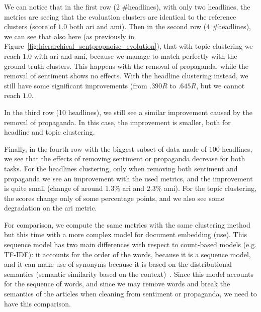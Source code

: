 We can notice that in the first row (2 \#headlines), with only two headlines, the metrics are seeing that the evaluation clusters are identical to the reference clusters (score of $1.0$ both \acrshort{ari} and \acrshort{ami}).
Then in the second row (4 \#headlines), we can see that also here (as previously in Figure~\ref{fig:hierarchical_sentpropnoise_evolution}), that with topic clustering we reach $1.0$ with \acrshort{ari} and \acrshort{ami}, because we manage to match perfectly with the ground truth clusters.
This happens with the removal of propaganda, while the removal of sentiment shows no effects.
With the headline clustering instead, we still have some significant improvements (from $.390R$ to $.645R$, but we cannot reach $1.0$.

In the third row (10 headlines), we still see a similar improvement caused by the removal of propaganda. In this case, the improvement is smaller, both for headline and topic clustering.

Finally, in the fourth row with the biggest subset of data made of 100 headlines, we see that the effects of removing sentiment or propaganda decrease for both tasks. For the headlines clustering, only when removing both sentiment and propaganda we see an improvement with the used metrics, and the improvement is quite small (change of around $1.3\%$ \acrshort{ari} and $2.3\%$ \acrshort{ami}). For the topic clustering, the scores change only of some percentage points, and we also see some degradation on the \acrshort{ari} metric.

For comparison, we compute the same metrics with the same clustering method but this time with a more complex model for document embedding (\acrshort{use}). This sequence model has two main differences with respect to count-based models (e.g. TF-IDF): it accounts for the order of the words, because it is a sequence model, and it can make use of synonyms because it is based on the distributional semantics (semantic similarity based on the context)~\citep{firth1957synopsis}. Since this model accounts for the sequence of words, and since we may remove words and break the semantics of the articles when cleaning from sentiment or propaganda, we need to have this comparison.

